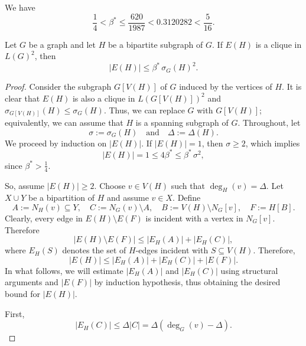 \documentclass[10pt,a4paper]{amsart}
\begin{document}
\begin{lemma}\label{lemma:beta} We have 
    \[ \frac{1}{4} < \beta^* \le \frac{620}{1987} < 0.3120282 < \frac{5}{16}.\]
\end{lemma}

\begin{lemma}\label{lemma:bipartite_subgraph}
Let $G$ be a graph and let $H$ be a bipartite subgraph of $G$. If
$E(H)$ is a clique in $L(G)^2$, then
\[
   |E(H)|\le \beta^*\,\sigma_G(H)^2.
\]
\end{lemma}

\begin{proof}
Consider the subgraph $G[V(H)]$ of $G$ induced by the vertices of $H$. It is clear that $E(H)$ is also a clique in $L(G[V(H)])^2$ and $\sigma_{G[V(H)]}(H) \le \sigma_G(H)$. Thus, we can replace $G$ with $G[V(H)]$; equivalently, we can assume that $H$ is a spanning subgraph of $G$. Throughout, let
\[
   \sigma:=\sigma_G(H)\quad \text{and} \quad \Delta:=\Delta(H).
\]
We proceed by induction on $|E(H)|$. If $|E(H)|=1$, then $\sigma\ge 2$, which implies
\[
   |E(H)|=1\le 4\beta^*\le \beta^*\,\sigma^2,
\]
since $\beta^* > \frac{1}{4}$. 

So, assume $|E(H)|\ge 2$. Choose $v\in V(H)$ such that $\deg_H(v)=\Delta$. Let $X\cup Y$ be a bipartition
of $H$ and assume $v\in X$. Define
\[
   A:=N_H(v)\subseteq Y,  \quad  C:= N_G(v)\setminus A, \quad B:=V(H)\setminus N_G[v], \quad  F:=H[B].
\]
Clearly, every edge in $E(H)\setminus E(F)$ is incident with a vertex in $N_G[v]$. Therefore
\[
   |E(H)\setminus E(F)|\le |E_H(A)| + |E_H(C)|,
\]
where $E_H(S)$ denotes the set of $H$-edges incident with $S\subseteq V(H)$.
Therefore, 
\begin{equation}\label{eq:H_bound_1}
   |E(H)|\le |E_H(A)| + |E_H(C)| + |E(F)|. 
\end{equation}
In what follows, we will estimate $|E_H(A)|$ and $|E_H(C)|$ using structural arguments and $|E(F)|$ by induction hypothesis, thus obtaining the desired bound for $|E(H)|$.

First,
\begin{equation}\label{eq:C_bound}
   |E_H(C)|\le \Delta |C| =\Delta(\deg_G(v)-\Delta).
\end{equation}


\end{proof}
\end{document}
